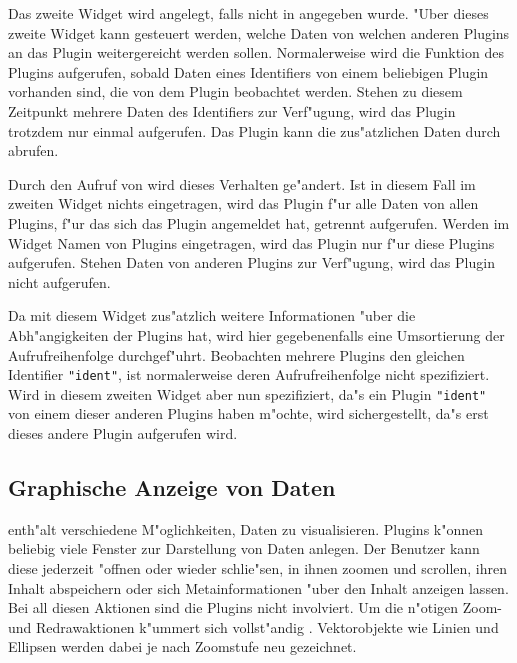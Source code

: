 Das zweite Widget wird angelegt, falls nicht
 in  angegeben wurde. "Uber
dieses zweite Widget kann gesteuert werden, welche Daten von welchen
anderen Plugins an das Plugin  weitergereicht werden
sollen. Normalerweise wird die Funktion  des Plugins
 aufgerufen, sobald Daten eines Identifiers von einem
beliebigen Plugin vorhanden sind, die von dem Plugin 
beobachtet werden. Stehen zu diesem Zeitpunkt mehrere Daten des
Identifiers zur Verf"ugung, wird das Plugin trotzdem nur einmal
aufgerufen. Das Plugin kann die zus"atzlichen Daten durch
 abrufen.

Durch den Aufruf von  wird dieses
Verhalten ge"andert. Ist in diesem Fall im zweiten Widget nichts
eingetragen, wird das Plugin f"ur alle Daten von allen Plugins, f"ur
das sich das Plugin angemeldet hat, getrennt aufgerufen. Werden im
Widget Namen von Plugins eingetragen, wird das Plugin nur f"ur diese
Plugins aufgerufen. Stehen Daten von anderen Plugins zur Verf"ugung,
wird das Plugin nicht aufgerufen.

Da \icewing{} mit diesem Widget zus"atzlich weitere Informationen
"uber die Abh"angigkeiten der Plugins hat, wird hier gegebenenfalls
eine Umsortierung der Aufrufreihenfolge durchgef"uhrt. Beobachten
mehrere Plugins den gleichen Identifier \verb|"ident"|, ist
normalerweise deren Aufrufreihenfolge nicht spezifiziert. Wird in
diesem zweiten Widget aber nun spezifiziert, da"s ein Plugin
\verb|"ident"| von einem dieser anderen Plugins haben m"ochte, wird
sichergestellt, da"s erst dieses andere Plugin aufgerufen wird.

\subsection{Graphische Anzeige von Daten}
\label{sub:p_rendering}

\icewing{} enth"alt verschiedene M"oglichkeiten, Daten zu
visualisieren. Plugins k"onnen beliebig viele Fenster zur
Darstellung von Daten anlegen. Der Benutzer kann diese jederzeit
"offnen oder wieder schlie"sen, in ihnen zoomen und scrollen, ihren
Inhalt abspeichern oder sich Metainformationen "uber den Inhalt
anzeigen lassen. Bei all diesen Aktionen sind die Plugins nicht
involviert. Um die n"otigen Zoom- und Redrawaktionen k"ummert sich
vollst"andig \icewing{}. Vektorobjekte wie Linien und Ellipsen
werden dabei je nach Zoomstufe neu gezeichnet.

